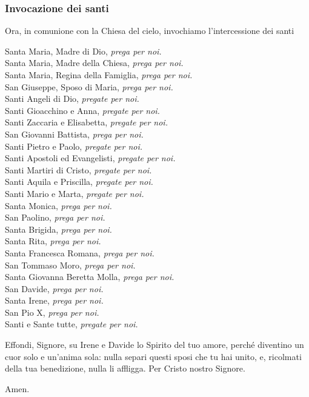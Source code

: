 \newpage

\subsubsection*{Invocazione dei santi}

	\begin{dialoghi}
	\item[\sacerdote] Ora, in comunione con la Chiesa del cielo, invochiamo l'intercessione dei santi

		Santa Maria, Madre di Dio, \textit{prega per noi.}\\
		Santa Maria, Madre della Chiesa, \textit{prega per noi.}\\
		Santa Maria, Regina della Famiglia, \textit{prega per noi.}\\
		San Giuseppe, Sposo di Maria, \textit{prega per noi.}\\
		Santi Angeli di Dio, \textit{pregate per noi.}\\
		Santi Gioacchino e Anna, \textit{pregate per noi.}\\
		Santi Zaccaria e Elisabetta, \textit{pregate per noi.}\\
		San Giovanni Battista, \textit{prega per noi.}\\
		Santi Pietro e Paolo, \textit{pregate per noi.}\\
		Santi Apostoli ed Evangelisti, \textit{pregate per noi.}\\
		Santi Martiri di Cristo, \textit{pregate per noi.}\\
		Santi Aquila e Priscilla, \textit{pregate per noi.}\\
		Santi Mario e Marta, \textit{pregate per noi.}\\
		Santa Monica, \textit{prega per noi.}\\
		San Paolino, \textit{prega per noi.}\\
		Santa Brigida, \textit{prega per noi.}\\
		Santa Rita, \textit{prega per noi.}\\
		Santa Francesca Romana, \textit{prega per noi.}\\
		San Tommaso Moro, \textit{prega per noi.}\\
		Santa Giovanna Beretta Molla, \textit{prega per noi.}\\
		San Davide, \textit{prega per noi.}\\
		Santa Irene, \textit{prega per noi.}\\
		San Pio X, \textit{prega per noi.}\\
		Santi e Sante tutte, \textit{pregate per noi.}
		\item[\sacerdote] Effondi, Signore, su Irene e Davide lo Spirito del tuo amore, perché diventino un cuor solo e un'anima sola: nulla separi questi sposi che tu hai unito, e, ricolmati della tua benedizione, nulla li affligga. Per Cristo nostro Signore.
		\item[\assemblea] Amen.
	\end{dialoghi}

\newpage